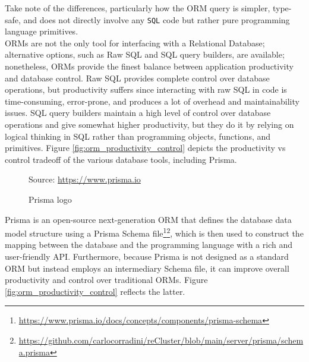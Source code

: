Take note of the differences, particularly how the ORM query is simpler, type-safe,
and does not directly involve any \texttt{SQL} code but rather pure programming language
primitives. \\ %
ORMs are not the only tool for interfacing with a Relational Database;
alternative options, such as Raw SQL and SQL query builders, are available; nonetheless,
ORMs provide the finest balance between application productivity and database
control. Raw SQL provides complete control over database operations, but
productivity suffers since interacting with raw SQL in code is time-consuming, error-prone,
and produces a lot of overhead and maintainability issues. SQL query builders maintain
a high level of control over database operations and give somewhat higher productivity,
but they do it by relying on logical thinking in SQL rather than programming
objects, functions, and primitives\cite{prisma_why}. Figure
\ref{fig:orm_productivity_control} depicts the productivity vs control tradeoff
of the various database tools, including Prisma.

\begin{figure} %
  \centering
  \def\stackalignment{l} %
  {\scriptsize \parbox[t]{\linewidth}{ Source: \url{https://www.prisma.io}} }
  \caption{Prisma logo}
\end{figure}

Prisma is an open-source next-generation ORM that defines the database data
model structure using a Prisma Schema file\footnote{\url{https://www.prisma.io/docs/concepts/components/prisma-schema}}\footnote{\url{https://github.com/carlocorradini/reCluster/blob/main/server/prisma/schema.prisma}},
which is then used to construct the mapping between the database and the programming
language with a rich and user-friendly API. Furthermore, because Prisma is not designed
as a standard ORM but instead employs an intermediary Schema file, it can
improve overall productivity and control over traditional ORMs\cite{prisma}.
Figure \ref{fig:orm_productivity_control} reflects the latter.

